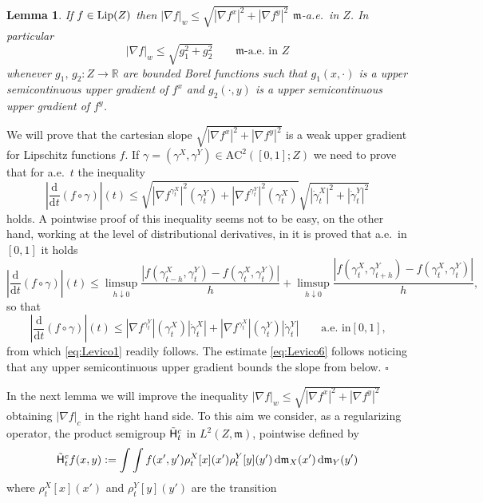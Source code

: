\documentclass[reqno,11pt]{article}
\numberwithin{equation}{section}
\newcommand{\R}{\mathbb{R}}
\newcommand{\mm}{{\mbox{\boldmath$m$}}}
\renewcommand{\d}{{\mathrm d}}
\newenvironment{proof}{\removelastskip\par\medskip   %
\noindent{\em Proof.}
\rm}{\penalty-20\null\hfill$\square$\par\medbreak}
\newtheorem{lemma}[theorem]{Lemma}
\newcommand{\weakgrad}[1]{|\nabla #1|_w}                %
\newcommand{\cartgrad}[1]{|\nabla #1|_c}
\newcommand{\heatl}{{\sf H}}
\newcommand{\AC}[3]{\mathrm{AC}^{#1}(#2;#3)}
\renewcommand{\mm}{\mathfrak m}
\begin{document}
\begin{lemma}\label{lem:Levico1}
If $f\in {\rm Lip}(Z)$ then $\weakgrad{f}\leq\sqrt{|\nabla
f^x|^2+|\nabla f^y|^2}$ $\mm$-a.e.~in $Z$. In particular
\begin{equation}\label{eq:Levico6}
\weakgrad{f}\leq \sqrt{g_1^2+g_2^2}\qquad\text{$\mm$-a.e.~in $Z$}
\end{equation}
whenever $g_1,\,g_2:Z\to\R$ are bounded Borel functions such that
$g_1(x,\cdot)$ is a upper semicontinuous upper gradient of $f^x$ and
$g_2(\cdot,y)$ is a upper semicontinuous upper gradient of $f^y$.
\end{lemma}
\begin{proof} We will prove that the cartesian slope $\sqrt{|\nabla
f^x|^2+|\nabla f^y|^2}$ is a weak upper gradient for Lipschitz
functions $f$. If $\gamma=(\gamma^X,\gamma^Y)\in \AC2{[0,1]}Z$ we
need to prove that for a.e.~$t$ the inequality
\begin{equation}\label{eq:Levico1}
|\frac{\d}{\d t} (f\circ\gamma)|(t)\leq \sqrt{|\nabla
f^{\gamma^X_t}|^2(\gamma^Y_t)+|\nabla f^{\gamma^Y_t}|^2(\gamma^X_t)}
\sqrt{|\dot\gamma^X_t|^2+|\dot\gamma^Y_t|^2}
\end{equation}
holds. A pointwise proof of this inequality seems not to be easy, on
the other hand, working at the level of distributional derivatives,
in \cite[Lemma~4.3.4]{Ambrosio-Gigli-Savare08} it is proved that
a.e.~in $[0,1]$ it holds
$$
|\frac{\d}{\d t} (f\circ\gamma)|(t)\leq\limsup_{h\downarrow
0}\frac{|f(\gamma^X_{t-h},\gamma^Y_t)-f(\gamma^X_t,\gamma^Y_t)|}{h}+
\limsup_{h\downarrow
0}\frac{|f(\gamma^X_t,\gamma^Y_{t+h})-f(\gamma^X_t,\gamma^Y_t)|}{h},
$$
so that
$$
|\frac{\d}{\d t} (f\circ\gamma)|(t)\leq |\nabla
f^{\gamma^Y_t}|(\gamma^X_t)|\dot\gamma^X_t|+ |\nabla
f^{\gamma^X_t}|(\gamma^Y_t)|\dot\gamma^Y_t|\qquad\text{a.e.~in
$[0,1]$,}
$$
from which \eqref{eq:Levico1} readily follows. The estimate
\eqref{eq:Levico6} follows noticing that any upper semicontinuous
upper gradient bounds the slope from below.
\end{proof}
%
In the next lemma we will improve the inequality
$\weakgrad{f}\leq\sqrt{|\nabla f^x|^2+|\nabla f^y|^2}$ obtaining
$\cartgrad{f}$ in the right hand side. To this aim we consider, as a
regularizing operator, the product semigroup $\tilde\heatl_t^c$ in
$L^2(Z,\mm)$, pointwise defined by
\begin{equation}\label{eq:Levico10}
\tilde\heatl_t^c f(x,y):=\int\int
f(x',y')\rho_t^X[x](x')\rho_t^Y[y](y')\,\d\mm_X(x')\,\d\mm_Y(y')
\end{equation}
where $\rho_t^X[x](x')$ and $\rho_t^Y[y](y')$ are the transition
\end{document}
